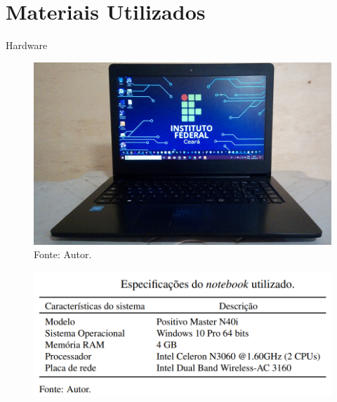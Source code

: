 \documentclass[aspectratio=169,12pt]{beamer}
\begin{document}
\section{Materiais Utilizados}
\begin{frame}{Hardware}
	\noindent
	\begin{minipage}[c]{0.48\linewidth}
		\begin{figure}[H]
			\centering
			\includegraphics[scale=.0535]{fig_tcc/notebook.jpg}
			\caption*{{\footnotesize Fonte: Autor.}}
		\end{figure}
	\end{minipage}
	\hfill%
	\begin{minipage}[c]{.48\linewidth}
		\begin{figure}[H]
			\centering
			\includegraphics[scale=0.3]{fig_tcc/tab_notebook.png}
		\end{figure}
	\end{minipage}
\end{frame}
\end{document}
